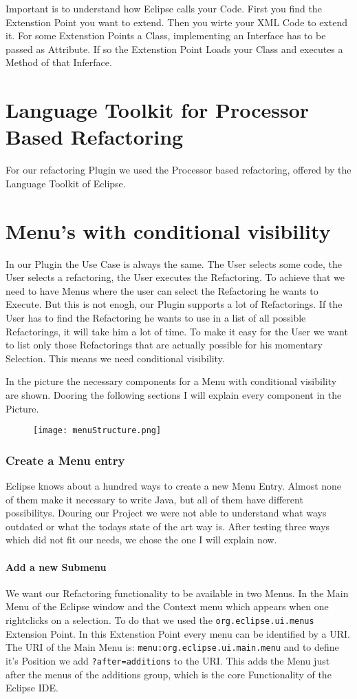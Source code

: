 \documentclass[a4paper,10pt]{report}
\begin{document}
Important is to understand how Eclipse calls your Code. First you find the Extenstion Point you want to extend. Then you wirte your XML Code to extend it. For some Extenstion Points a Class, implementing an Interface has to be passed as Attribute. If so the Extenstion Point Loads your Class and executes a Method of that Inferface.


\chapter{Language Toolkit for Processor Based Refactoring}
For our refactoring Plugin we used the Processor based refactoring, offered by the Language Toolkit of Eclipse. 


\chapter{Menu's with conditional visibility}
In our Plugin the Use Case is always the same. The User selects some code, the User selects a refactoring, the User executes the Refactoring. To achieve that we need to have Menus where the user can select the Refactoring he wants to Execute.
But this is not enogh, our Plugin supports a lot of Refactorings. If the User has to find the Refactoring he wants to use in a list of all possible Refactorings, it will take him a lot of time.
To make it easy for the User we want to list only those Refactorings that are actually possible for his momentary Selection. This means we need conditional visibility.

In the picture the necessary components for a Menu with conditional visibility are shown. Dooring the following sections I will explain every component in the Picture.
\begin{figure}[h]
\centering
\texttt{[image: menuStructure.png]}
\end{figure}

\subsection{Create a Menu entry}
Eclipse knows about a hundred ways to create a new Menu Entry. Almost none of them make it necessary to write Java, but all of them have different possibilitys. 
Douring our Project we were not able to understand what ways outdated or what the todays state of the art way is. After testing three ways which did not fit our needs,
we chose the one I will explain now. 

\subsubsection{Add a new Submenu}
We want our Refactoring functionality to be available in two Menus. In the Main Menu of the Eclipse window and the Context menu which appears when one rightclicks on
a selection. To do that we used the \verb!org.eclipse.ui.menus! Extension Point. In this Extenstion Point every menu can be identified by a URI. The URI of the Main Menu is:
\verb!menu:org.eclipse.ui.main.menu! and to define it's Position we add \verb!?after=additions! to the URI. This adds the Menu just after the menus of the additions group, 
which is the core Functionality of the Eclipse IDE.
\end{document}
